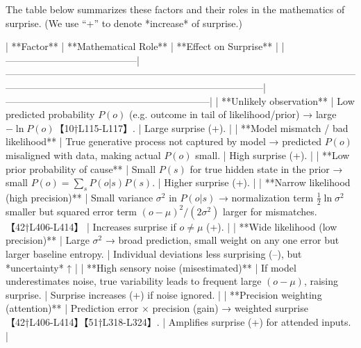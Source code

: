 \documentclass[a4paper]{article}
\begin{document}
    The table below summarizes these factors and their roles in the mathematics of surprise. (We use “+” to denote *increase* of surprise.)
    
    | **Factor**                              | **Mathematical Role**                                                                                                                                                                      | **Effect on Surprise**                                        |
    |-----------------------------------------|--------------------------------------------------------------------------------------------------------------------------------------------------------------------------------------------|---------------------------------------------------------------|
    | **Unlikely observation**                | Low predicted probability \(P(o)\) (e.g. outcome in tail of likelihood/prior) → large \(-\ln P(o)\)【10†L115-L117】.                                                                 | Large surprise (+).                                           |
    | **Model mismatch / bad likelihood**     | True generative process not captured by model → predicted \(P(o)\) misaligned with data, making actual \(P(o)\) small.                                                                     | High surprise (+).                                           |
    | **Low prior probability of cause**      | Small \(P(s)\) for true hidden state in the prior → small \(P(o)=\sum_sP(o|s)P(s)\).                                                                                                      | Higher surprise (+).                                         |
    | **Narrow likelihood (high precision)**  | Small variance \(\sigma^2\) in \(P(o|s)\) → normalization term \(\frac12\ln\sigma^2\) smaller but squared error term \((o-\mu)^2/(2\sigma^2)\) larger for mismatches.【42†L406-L414】  | Increases surprise if \(o\neq \mu\) (+).                     |
    | **Wide likelihood (low precision)**     | Large \(\sigma^2\) → broad prediction, small weight on any one error but larger baseline entropy.                                                                                         | Individual deviations less surprising (–), but *uncertainty* ↑ |
    | **High sensory noise (misestimated)**   | If model underestimates noise, true variability leads to frequent large \((o-\mu)\), raising surprise.                                                                                     | Surprise increases (+) if noise ignored.                     |
    | **Precision weighting (attention)**     | Prediction error \(\times\) precision (gain) → weighted surprise【42†L406-L414】【51†L318-L324】.                                                                                           | Amplifies surprise (+) for attended inputs.                  |
\end{document}
